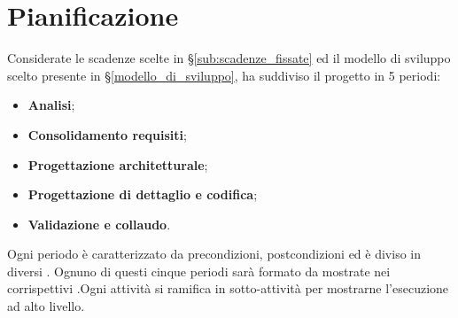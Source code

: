 \section{Pianificazione}
\label{pianificazione}
Considerate le scadenze scelte in \S\ref{sub:scadenze_fissate} ed il modello di sviluppo scelto presente in \S\ref{modello_di_sviluppo}, {\Gruppo} ha suddiviso il progetto in 5 periodi:
\begin{itemize}
    \item \textbf{Analisi};
    \item \textbf{Consolidamento requisiti};
    \item \textbf{Progettazione architetturale};
    \item \textbf{Progettazione di dettaglio e codifica};
    \item \textbf{Validazione e collaudo}.
\end{itemize}
Ogni periodo è caratterizzato da precondizioni, postcondizioni ed è diviso in diversi . Ognuno di questi cinque periodi sarà formato da  mostrate nei corrispettivi .Ogni attività si ramifica in sotto-attività per mostrarne l'esecuzione ad alto livello.


\newpage

\newpage

\newpage

\newpage

\newpage
